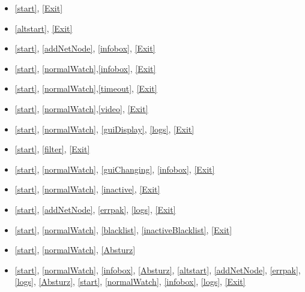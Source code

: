 \begin{itemize}
  \item \ref{start}, \ref{Exit}
  \item \ref{altstart}, \ref{Exit}
  \item \ref{start}, \ref{addNetNode}, \ref{infobox}, \ref{Exit}
  \item \ref{start}, \ref{normalWatch},\ref{infobox}, \ref{Exit}
  \item \ref{start}, \ref{normalWatch},\ref{timeout}, \ref{Exit}
  \item \ref{start}, \ref{normalWatch},\ref{video}, \ref{Exit}
  \item \ref{start}, \ref{normalWatch}, \ref{guiDisplay}, \ref{logs}, \ref{Exit}
  \item \ref{start}, \ref{filter}, \ref{Exit}
  \item \ref{start}, \ref{normalWatch}, \ref{guiChanging}, \ref{infobox}, \ref{Exit}
  \item \ref{start}, \ref{normalWatch}, \ref{inactive}, \ref{Exit}
  \item \ref{start}, \ref{addNetNode}, \ref{errpak}, \ref{logs}, \ref{Exit}
  \item \ref{start}, \ref{normalWatch}, \ref{blacklist}, \ref{inactiveBlacklist}, \ref{Exit}
  \item \ref{start}, \ref{normalWatch}, \ref{Absturz}
  \item \ref{start}, \ref{normalWatch}, \ref{infobox}, \ref{Absturz}, \ref{altstart}, \ref{addNetNode}, \ref{errpak}, \ref{logs}, \ref{Absturz}, \ref{start}, \ref{normalWatch}, \ref{infobox}, \ref{logs}, \ref{Exit}
\end{itemize}
